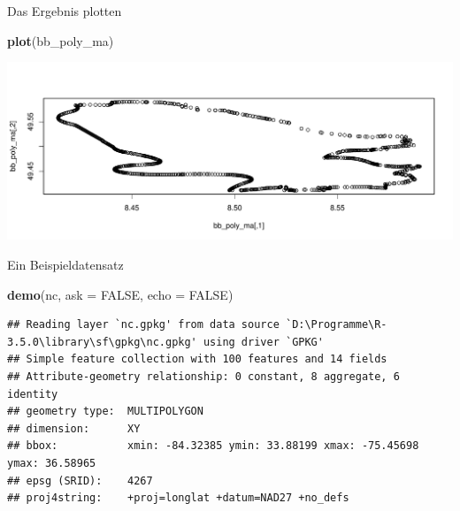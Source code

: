 \documentclass[ignorenonframetext,]{beamer}
\newenvironment{Shaded}{\begin{snugshade}}{\end{snugshade}}
\newcommand{\KeywordTok}[1]{\textcolor[rgb]{0.13,0.29,0.53}{\textbf{#1}}}
\newcommand{\DataTypeTok}[1]{\textcolor[rgb]{0.13,0.29,0.53}{#1}}
\newcommand{\OtherTok}[1]{\textcolor[rgb]{0.56,0.35,0.01}{#1}}
\newcommand{\NormalTok}[1]{#1}
\begin{document}
\begin{frame}[fragile]{Das Ergebnis plotten}

\begin{Shaded}
\begin{Highlighting}[]
\KeywordTok{plot}\NormalTok{(bb_poly_ma)}
\end{Highlighting}
\end{Shaded}

\includegraphics{simplefeatures_files/figure-beamer/unnamed-chunk-6-1.pdf}

\end{frame}

\begin{frame}[fragile]{Ein Beispieldatensatz}

\begin{Shaded}
\begin{Highlighting}[]
\KeywordTok{demo}\NormalTok{(nc, }\DataTypeTok{ask =} \OtherTok{FALSE}\NormalTok{, }\DataTypeTok{echo =} \OtherTok{FALSE}\NormalTok{)}
\end{Highlighting}
\end{Shaded}

\begin{verbatim}
## Reading layer `nc.gpkg' from data source `D:\Programme\R-3.5.0\library\sf\gpkg\nc.gpkg' using driver `GPKG'
## Simple feature collection with 100 features and 14 fields
## Attribute-geometry relationship: 0 constant, 8 aggregate, 6 identity
## geometry type:  MULTIPOLYGON
## dimension:      XY
## bbox:           xmin: -84.32385 ymin: 33.88199 xmax: -75.45698 ymax: 36.58965
## epsg (SRID):    4267
## proj4string:    +proj=longlat +datum=NAD27 +no_defs
\end{verbatim}

\end{frame}
\end{document}
